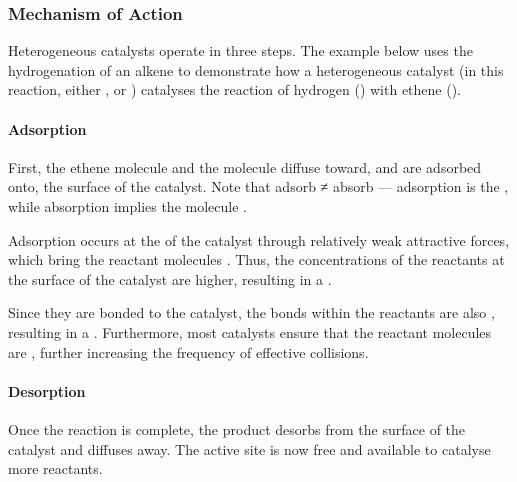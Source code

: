 			\subsubsection{Mechanism of Action}

				Heterogeneous catalysts operate in three steps. The example below uses the hydrogenation of an alkene to demonstrate how a
				heterogeneous catalyst (in this reaction, either ,  or ) catalyses the reaction of
				hydrogen () with ethene ().


				\paragraph{Adsorption}

				First, the ethene molecule and the  molecule diffuse toward, and are adsorbed onto, the surface of the catalyst.
				Note that adsorb ≠ absorb --- adsorption is the , while absorption implies the molecule .

				Adsorption occurs at the  of the catalyst through relatively weak attractive forces, which bring
				the reactant molecules . Thus, the concentrations of the reactants at the surface of the catalyst
				are higher, resulting in a .

				Since they are bonded to the catalyst, the bonds within the reactants are also , resulting in a
				. Furthermore, most catalysts ensure that the reactant molecules are
				, further increasing the frequency of effective collisions.



				\paragraph{Desorption}

				Once the reaction is complete, the product desorbs from the surface of the catalyst and diffuses away. The active site is now
				free and available to catalyse more reactants.




